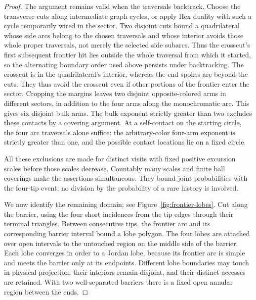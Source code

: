 \begin{proof}
The argument remains valid when the traversals backtrack.  Choose the
transverse cuts along intermediate graph cycles, or apply Hex duality
with such a cycle temporarily wired in the sector.  Two disjoint cuts
bound a quadrilateral whose side arcs belong to the chosen traversals
and whose interior avoids those whole proper traversals, not merely
the selected side subarcs.  Thus the crosscut's first subsequent
frontier hit lies outside the whole traversal from which it started,
so the alternating boundary order used above persists under
backtracking.  The crosscut is in the quadrilateral's interior, whereas the end spokes are beyond
the cuts.  They thus avoid the crosscut even if other portions of the
frontier enter the sector.  Cropping the margins leaves two disjoint
opposite-colored arms in different sectors, in addition to the four
arms along the monochromatic arc.  This gives six disjoint bulk arms.
The bulk exponent strictly greater than two excludes these contacts
by a covering argument.  At a self-contact on the starting circle,
the four arc traversals alone suffice: the arbitrary-color four-arm
exponent is strictly greater than one, and the possible contact
locations lie on a fixed circle.

All these exclusions are made for distinct visits with fixed positive
excursion scales before those scales decrease.  Countably many scales
and finite ball coverings make the assertions simultaneous.  They
bound joint probabilities with the four-tip event; no division by the
probability of a rare history is involved.

We now identify the remaining domain; see
Figure~\ref{fig:frontier-lobes}.  Cut along the barrier, using the
four short incidences from the tip edges through their terminal
triangles.  Between consecutive tips, the frontier arc and its
corresponding barrier interval bound a lobe polygon.  The four lobes
are attached over open intervals to the untouched region on the middle
side of the barrier.  Each lobe converges in order to a Jordan lobe,
because its frontier arc is simple and meets the barrier only at its
endpoints.  Different lobe boundaries may touch in physical projection;
their interiors remain disjoint, and their distinct accesses are
retained.  With two well-separated barriers there is a fixed open
annular region between the ends.


\end{proof}
